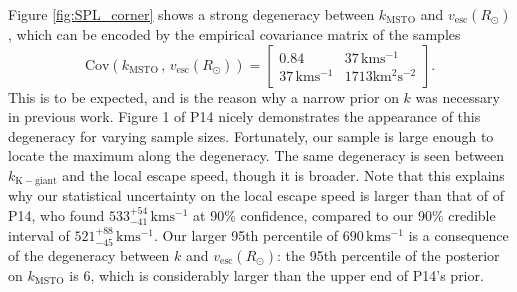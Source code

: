 \documentclass[useAMS,twocolumn,usenatbib]{mn2e}
\def\kms{{\,\mathrm{kms^{-1}}}}
\def\vesc{{v_\mathrm{esc}}}
\begin{document}
Figure \ref{fig:SPL_corner} shows a strong degeneracy between $k_\mathrm{MSTO}$ and $\vesc(R_\odot)$, which can be encoded by the empirical covariance matrix of the samples
%
\begin{equation}
\mathrm{Cov}\left(k_\mathrm{MSTO}\,,\,\vesc(R_\odot)\right) = \begin{bmatrix} 0.84 & 37\kms \\ 37\kms & 1713 \mathrm{km^2s^{-2}}\end{bmatrix}.
\end{equation}
%
This is to be expected, and is the reason why a narrow prior on $k$ was necessary in previous work. 
Figure 1 of P14 nicely demonstrates the appearance of this degeneracy for varying sample sizes. 
Fortunately, our sample is large enough to locate the maximum along the degeneracy. 
The same degeneracy is seen between $k_\mathrm{K-giant}$ and the local escape speed, though it is broader.
Note that this explains why our statistical uncertainty on the local escape speed is larger than that of of P14, who found $533^{+54}_{-41}\kms$ at 90\% confidence, compared to our 90\% credible interval of $521^{+88}_{-45}\kms$.
Our larger 95th percentile of $690\kms$ is a consequence of the degeneracy between $k$ and $\vesc(R_\odot)$: the 95th percentile of the posterior on $k_\mathrm{MSTO}$ is 6, which is considerably larger than the upper end of P14's prior.
\end{document}
